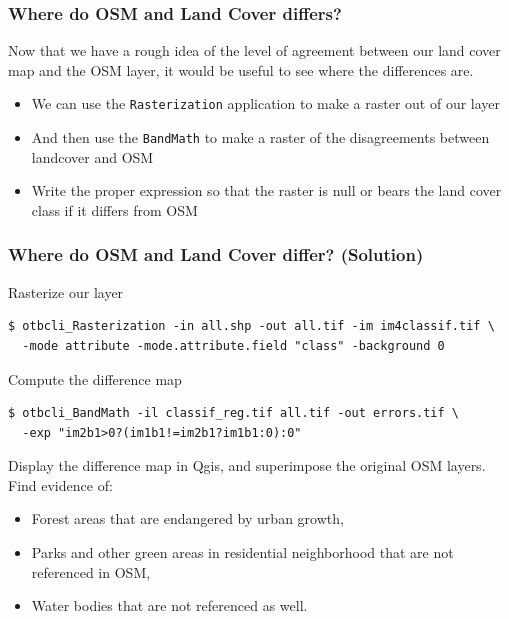 \documentclass[8pt]{beamer}
\begin{document}
\begin{frame}
\frametitle{Where do OSM and Land Cover differs?}

Now that we have a rough idea of the level of agreement between our
land cover map and the OSM layer, it would be useful to see where the differences are.

\begin{itemize}
\item We can use the \texttt{Rasterization} application to make a raster out of our layer
\item And then use the \texttt{BandMath} to make a raster of the disagreements between landcover and OSM
\item Write the proper expression so that the raster is null or bears the land cover class if it differs from OSM
\end{itemize}

\end{frame}

\begin{frame}[fragile]
\frametitle{Where do OSM and Land Cover differ? (Solution)}

\begin{block}{Rasterize our layer}
\begin{scriptsize}
\begin{verbatim}
$ otbcli_Rasterization -in all.shp -out all.tif -im im4classif.tif \
  -mode attribute -mode.attribute.field "class" -background 0
\end{verbatim}
\end{scriptsize}
\end{block}
\begin{block}{Compute the difference map}
\begin{scriptsize}
\begin{verbatim}
$ otbcli_BandMath -il classif_reg.tif all.tif -out errors.tif \
  -exp "im2b1>0?(im1b1!=im2b1?im1b1:0):0"
\end{verbatim}
\end{scriptsize}
\end{block}
Display the difference map in Qgis, and superimpose the original OSM layers. Find evidence of:
\begin{itemize}
\item Forest areas that are endangered by urban growth,
\item Parks and other green areas in residential neighborhood that are not referenced in OSM,
\item Water bodies that are not referenced as well.
\end{itemize}
\end{frame}
\end{document}
